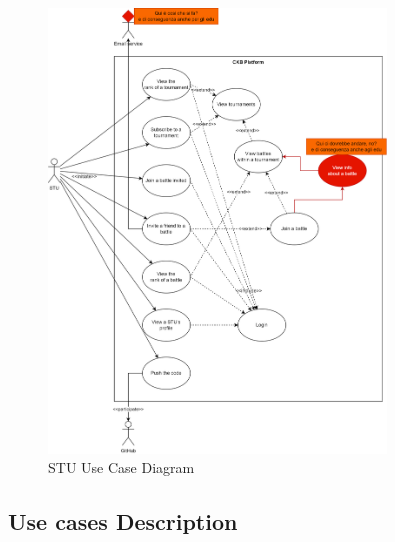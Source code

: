 \begin{figure}[H]
    \centering
    \includegraphics[width=0.8\textwidth]{images/sequence_diagrams/use_case_diagrams_STU.png}
    \caption{STU Use Case Diagram}
\end{figure}

\subsection{Use cases Description}

